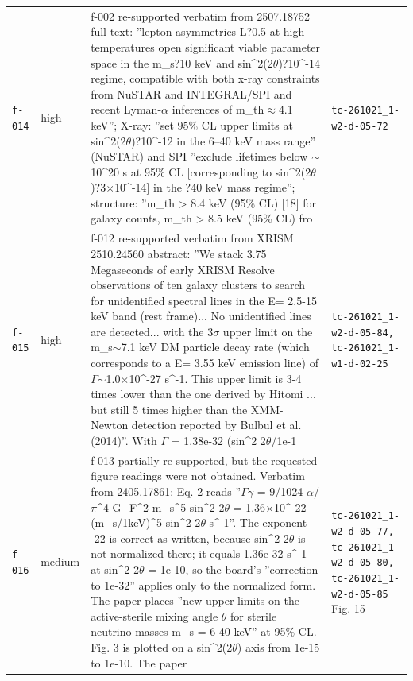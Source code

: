 \documentclass[11pt,a4paper]{article}
\begin{document}
\begin{longtable}{@{}p{}p{}p{}p{}@{}}
\texttt{f-014} & high & f-002 re-supported verbatim from 2507.18752 full text: ''lepton asymmetries L?0.5 at high temperatures open significant viable parameter space in the m\_s?10 keV and sin\textasciicircum{}2(2$\theta$)?10\textasciicircum{}-14 regime, compatible with both x-ray constraints from NuSTAR and INTEGRAL/SPI and recent Lyman-$\alpha$ inferences of m\_th$\approx$4.1 keV''; X-ray: ''set 95\% CL upper limits at sin\textasciicircum{}2(2$\theta$)?10\textasciicircum{}-12 in the 6--40 keV mass range'' (NuSTAR) and SPI ''exclude lifetimes below $\sim$10\textasciicircum{}20 s at 95\% CL [corresponding to sin\textasciicircum{}2(2$\theta$)?3$\times$10\textasciicircum{}-14] in the ?40 keV mass regime''; structure: ''m\_th \textgreater{} 8.4 keV (95\% CL) [18] for galaxy counts, m\_th \textgreater{} 8.5 keV (95\% CL) fro & \texttt{tc-261021\_\allowbreak{}1-w2-d-05-72} \\
\texttt{f-015} & high & f-012 re-supported verbatim from XRISM 2510.24560 abstract: ''We stack 3.75 Megaseconds of early XRISM Resolve observations of ten galaxy clusters to search for unidentified spectral lines in the E= 2.5-15 keV band (rest frame)... No unidentified lines are detected... with the 3$\sigma$ upper limit on the m\_s$\sim$7.1 keV DM particle decay rate (which corresponds to a E= 3.55 keV emission line) of $\Gamma$$\sim$1.0$\times$10\textasciicircum{}-27 s\textasciicircum{}-1. This upper limit is 3-4 times lower than the one derived by Hitomi ... but still 5 times higher than the XMM-Newton detection reported by Bulbul et al. (2014)''. With $\Gamma$ = 1.38e-32 (sin\textasciicircum{}2 2$\theta$/1e-1 & \texttt{tc-261021\_\allowbreak{}1-w2-d-05-84,\allowbreak{} tc-261021\_\allowbreak{}1-w1-d-02-25} \\
\texttt{f-016} & medium & f-013 partially re-supported, but the requested figure readings were not obtained. Verbatim from 2405.17861: Eq. 2 reads ''$\Gamma$$\gamma$ = 9/1024 $\alpha$/$\pi$\textasciicircum{}4 G\_F\textasciicircum{}2 m\_s\textasciicircum{}5 sin\textasciicircum{}2 2$\theta$ = 1.36$\times$10\textasciicircum{}-22 (m\_s/1keV)\textasciicircum{}5 sin\textasciicircum{}2 2$\theta$ s\textasciicircum{}-1''. The exponent -22 is correct as written, because sin\textasciicircum{}2 2$\theta$ is not normalized there; it equals 1.36e-32 s\textasciicircum{}-1 at sin\textasciicircum{}2 2$\theta$ = 1e-10, so the board's ''correction to 1e-32'' applies only to the normalized form. The paper places ''new upper limits on the active-sterile mixing angle $\theta$ for sterile neutrino masses m\_s = 6-40 keV'' at 95\% CL. Fig. 3 is plotted on a sin\textasciicircum{}2(2$\theta$) axis from 1e-15 to 1e-10. The paper & \texttt{tc-261021\_\allowbreak{}1-w2-d-05-77,\allowbreak{} tc-261021\_\allowbreak{}1-w2-d-05-80,\allowbreak{} tc-261021\_\allowbreak{}1-w2-d-05-85} Fig. 15 \\

\end{longtable}
\end{document}
